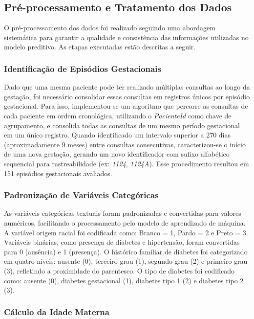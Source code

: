 \documentclass[12pt, a4paper]{report}
\theoremstyle{definition}
\theoremstyle{remark}
\theoremstyle{plain}
\begin{document}
\subsection{Pré-processamento e Tratamento dos Dados}

O pré-processamento dos dados foi realizado seguindo uma abordagem sistemática para garantir a qualidade e consistência das informações utilizadas no modelo preditivo. As etapas executadas estão descritas a seguir.

\subsubsection{Identificação de Episódios Gestacionais}

Dado que uma mesma paciente pode ter realizado múltiplas consultas ao longo da gestação, foi necessário consolidar essas consultas em registros únicos por episódio gestacional. Para isso, implementou-se um algoritmo que percorre as consultas de cada paciente em ordem cronológica, utilizando o \textit{PacienteId} como chave de agrupamento, e consolida todas as consultas de um mesmo período gestacional em um único registro. Quando identificado um intervalo superior a 270 dias (aproximadamente 9 meses) entre consultas consecutivas, caracterizou-se o início de uma nova gestação, gerando um novo identificador com sufixo alfabético sequencial para rastreabilidade (ex: \textit{1124}, \textit{1124A}). Esse procedimento resultou em 151 episódios gestacionais avaliados.

\subsubsection{Padronização de Variáveis Categóricas}

As variáveis categóricas textuais foram padronizadas e convertidas para valores numéricos, facilitando o processamento pelo modelo de aprendizado de máquina. A variável origem racial foi codificada como: Branco = 1, Pardo = 2 e Preto = 3. Variáveis binárias, como presença de diabetes e hipertensão, foram convertidas para 0 (ausência) e 1 (presença). O histórico familiar de diabetes foi categorizado em quatro níveis: ausente (0), terceiro grau (1), segundo grau (2) e primeiro grau (3), refletindo a proximidade do parentesco. O tipo de diabetes foi codificado como: ausente (0), diabetes gestacional (1), diabetes tipo 1 (2) e diabetes tipo 2 (3).

\subsubsection{Cálculo da Idade Materna}
\end{document}
